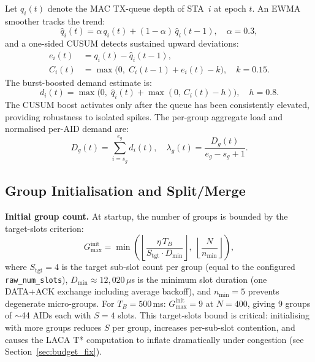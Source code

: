 \documentclass[conference]{IEEEtran}
\begin{document}
Let $q_i(t)$ denote the MAC TX-queue depth of STA~$i$ at epoch $t$.
An EWMA smoother tracks the trend:
\begin{equation}
  \hat{q}_i(t) = \alpha\,q_i(t) + (1-\alpha)\,\hat{q}_i(t-1),
  \quad \alpha=0.3,
  \label{eq:ewma}
\end{equation}
and a one-sided CUSUM detects sustained upward deviations:
\begin{align}
  e_i(t)   &= q_i(t) - \hat{q}_i(t-1), \label{eq:err}\\
  C_i(t)   &= \max\!\bigl(0,\;C_i(t-1)+e_i(t)-k\bigr),\quad k=0.15.
  \label{eq:cusum}
\end{align}
The burst-boosted demand estimate is:
\begin{equation}
  d_i(t) = \max\!\bigl(0,\;\hat{q}_i(t)+\max(0,\,C_i(t)-h)\bigr),
  \quad h=0.8.
  \label{eq:demand}
\end{equation}
The CUSUM boost activates only after the queue has been consistently
elevated, providing robustness to isolated spikes.
The per-group aggregate load and normalised per-AID demand are:
\begin{equation}
  D_g(t) = \sum_{i=s_g}^{e_g} d_i(t), \quad
  \lambda_g(t) = \frac{D_g(t)}{e_g - s_g + 1}.
  \label{eq:group_load}
\end{equation}

\subsection{Group Initialisation and Split/Merge}
\label{sec:split_merge}

\textbf{Initial group count.}
At startup, the number of groups is bounded by the target-slots
criterion:
\begin{equation}
  G_\mathrm{max}^\mathrm{init} = \min\!\left(
    \left\lfloor\frac{\eta\,T_B}{S_\mathrm{tgt}\cdot D_\mathrm{min}}\right\rfloor,\;
    \left\lfloor\frac{N}{n_\mathrm{min}}\right\rfloor
  \right),
  \label{eq:gmax_init}
\end{equation}
where $S_\mathrm{tgt}\!=\!4$ is the target sub-slot count per group
(equal to the configured \texttt{raw\_num\_slots}),
$D_\mathrm{min}\!\approx\!12{,}020\,\mu$s is the minimum slot duration
(one DATA+ACK exchange including average backoff), and
$n_\mathrm{min}\!=\!5$ prevents degenerate micro-groups.
For $T_B\!=\!500$\,ms: $G_\mathrm{max}^\mathrm{init}\!=\!9$ at $N\!=\!400$,
giving 9 groups of $\sim$44 AIDs each with $S\!=\!4$ slots.
This target-slots bound is critical: initialising with more groups
reduces $S$ per group, increases per-sub-slot contention, and causes
the LACA T* computation to inflate dramatically under congestion
(see Section~\ref{sec:budget_fix}).
\end{document}
